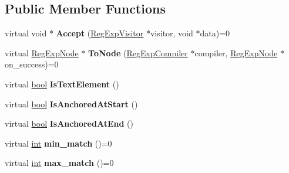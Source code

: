 \subsection*{Public Member Functions}
\begin{DoxyCompactItemize}
\item 
\mbox{\label{classv8_1_1internal_1_1RegExpTree_a47b10904011eb76bb081c2354c5d0232}} 
virtual void $\ast$ {\bfseries Accept} (\mbox{\hyperlink{classv8_1_1internal_1_1RegExpVisitor}{Reg\+Exp\+Visitor}} $\ast$visitor, void $\ast$data)=0
\item 
\mbox{\label{classv8_1_1internal_1_1RegExpTree_a9670a35c2a033db8032ca275910e1ac2}} 
virtual \mbox{\hyperlink{classv8_1_1internal_1_1RegExpNode}{Reg\+Exp\+Node}} $\ast$ {\bfseries To\+Node} (\mbox{\hyperlink{classv8_1_1internal_1_1RegExpCompiler}{Reg\+Exp\+Compiler}} $\ast$compiler, \mbox{\hyperlink{classv8_1_1internal_1_1RegExpNode}{Reg\+Exp\+Node}} $\ast$on\+\_\+success)=0
\item 
\mbox{\label{classv8_1_1internal_1_1RegExpTree_ad942297d0d8695a8401e3841d9ad5b8c}} 
virtual \mbox{\hyperlink{classbool}{bool}} {\bfseries Is\+Text\+Element} ()
\item 
\mbox{\label{classv8_1_1internal_1_1RegExpTree_a63684350c648009df5ee42068a39a4fc}} 
virtual \mbox{\hyperlink{classbool}{bool}} {\bfseries Is\+Anchored\+At\+Start} ()
\item 
\mbox{\label{classv8_1_1internal_1_1RegExpTree_a6a53cc0f2787e7cd698f5c44886f9816}} 
virtual \mbox{\hyperlink{classbool}{bool}} {\bfseries Is\+Anchored\+At\+End} ()
\item 
\mbox{\label{classv8_1_1internal_1_1RegExpTree_a6aee84bbe2e078446f84681b70ebc32a}} 
virtual \mbox{\hyperlink{classint}{int}} {\bfseries min\+\_\+match} ()=0
\item 
\mbox{\label{classv8_1_1internal_1_1RegExpTree_ad27450dae179517a30b47de7eedde3c4}} 
virtual \mbox{\hyperlink{classint}{int}} {\bfseries max\+\_\+match} ()=0
\item 

\end{DoxyCompactItemize}
